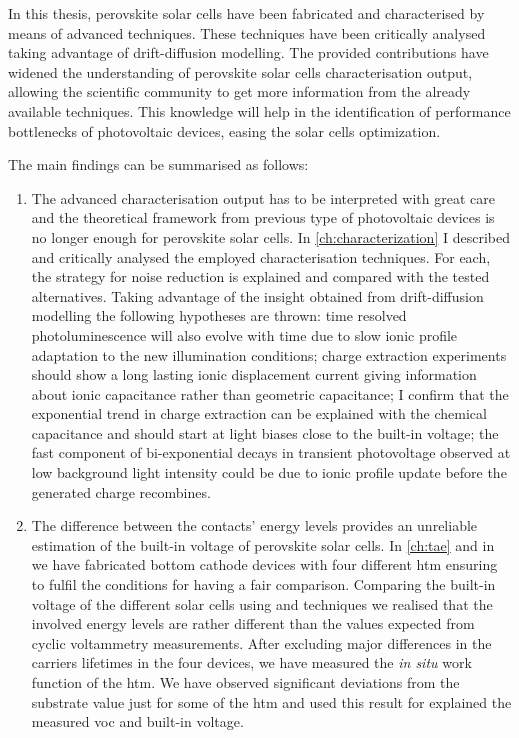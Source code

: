 
In this thesis, perovskite solar cells have been fabricated and characterised by means of advanced techniques.
These techniques have been critically analysed taking advantage of drift\hyp{}diffusion modelling.
The provided contributions have widened the understanding of perovskite solar cells characterisation output, allowing the scientific community to get more information from the already available techniques.
This knowledge will help in the identification of performance bottlenecks of photovoltaic devices, easing the solar cells optimization.

The main findings can be summarised as follows:
\begin{enumerate}
	\item The advanced characterisation output has to be interpreted with great care and the theoretical framework from previous type of photovoltaic devices is no longer enough for perovskite solar cells.
	In \cref{ch:characterization} I described and critically analysed the employed characterisation techniques.
	For each, the strategy for noise reduction is explained and compared with the tested alternatives.
	Taking advantage of the insight obtained from drift\hyp{}diffusion modelling the following hypotheses are thrown:
	time resolved photoluminescence will also evolve with time due to slow ionic profile adaptation to the new illumination conditions;
	charge extraction experiments should show a long lasting ionic displacement current giving information about ionic capacitance rather than geometric capacitance;
	I confirm that the exponential trend in charge extraction can be explained with the chemical capacitance and should start at light biases close to the built-in voltage;
	the fast component of bi\hyp{}exponential decays in transient photovoltage observed at low background light intensity could be due to ionic profile update before the generated charge recombines.
	
	\item The difference between the contacts' energy levels provides an unreliable estimation of the built-in voltage of perovskite solar cells.
	In \cref{ch:tae} and in \cite{Gelmetti2019} we have fabricated bottom cathode devices with four different \gls{htm} ensuring to fulfil the conditions for having a fair comparison.
	Comparing the built-in voltage of the different solar cells using  and  techniques we realised that the involved energy levels are rather different than the values expected from cyclic voltammetry measurements.
	After excluding major differences in the carriers lifetimes in the four devices, we have measured the \textsl{in situ} work function of the \gls{htm}.
	We have observed significant deviations from the substrate value just for some of the \gls{htm} and used this result for explained the measured \gls{voc} and built-in voltage.
		

\end{enumerate}
